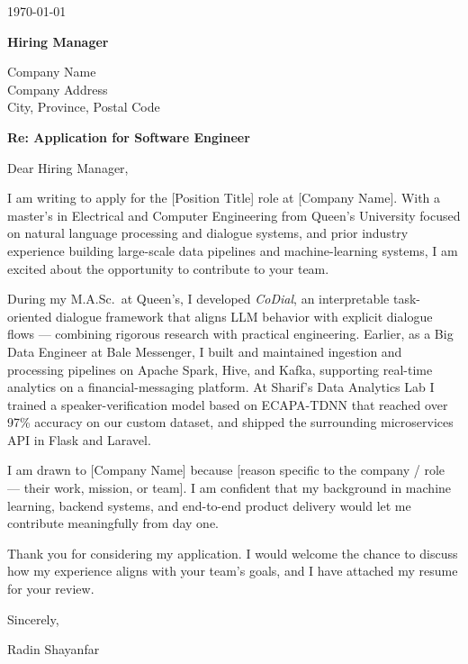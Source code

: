 \documentclass[11pt,letterpaper]{article}
\newcommand{\recipientname}{Hiring Manager}
\newcommand{\recipientorg}{Company Name}
\newcommand{\recipientaddr}{Company Address\\City, Province, Postal Code}
\newcommand{\lettertitleline}{Application for Software Engineer}
\newcommand{\letterdate}{\today}
\begin{document}
\header{}

\vspace{6pt}

{\color{subtle}\letterdate}\par
\vspace{8pt}
\textbf{\recipientname}\par
\recipientorg\\
\recipientaddr\par

\vspace{10pt}
\textbf{Re: \lettertitleline}\par
\vspace{8pt}

Dear \recipientname,

\vspace{4pt}

I am writing to apply for the [Position Title] role at [Company Name]. With a master's in Electrical and Computer Engineering from Queen's University focused on natural language processing and dialogue systems, and prior industry experience building large-scale data pipelines and machine-learning systems, I am excited about the opportunity to contribute to your team.

\vspace{4pt}

During my M.A.Sc.\ at Queen's, I developed \textit{CoDial}, an interpretable task-oriented dialogue framework that aligns LLM behavior with explicit dialogue flows --- combining rigorous research with practical engineering. Earlier, as a Big Data Engineer at Bale Messenger, I built and maintained ingestion and processing pipelines on Apache Spark, Hive, and Kafka, supporting real-time analytics on a financial-messaging platform. At Sharif's Data Analytics Lab I trained a speaker-verification model based on ECAPA-TDNN that reached over 97\% accuracy on our custom dataset, and shipped the surrounding microservices API in Flask and Laravel.

\vspace{4pt}

I am drawn to [Company Name] because [reason specific to the company / role --- their work, mission, or team]. I am confident that my background in machine learning, backend systems, and end-to-end product delivery would let me contribute meaningfully from day one.

\vspace{4pt}

Thank you for considering my application. I would welcome the chance to discuss how my experience aligns with your team's goals, and I have attached my resume for your review.

\vspace{10pt}

Sincerely,\par
\vspace{18pt}
Radin Shayanfar
\end{document}
